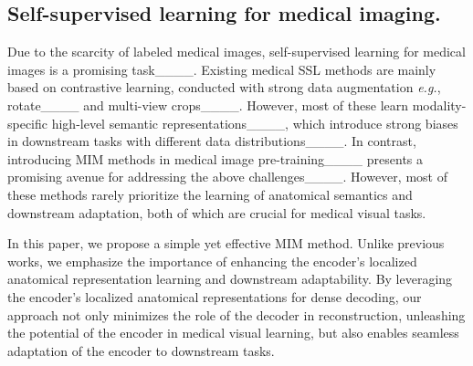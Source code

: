 \subsection{Self-supervised learning for medical imaging.}
Due to the scarcity of labeled medical images, self-supervised learning for medical images is a promising task____. Existing medical SSL methods are mainly based on contrastive learning, conducted with strong data augmentation \textit{e.g.}, rotate____ and multi-view crops____. However, most of these learn modality-specific high-level semantic representations____, which introduce strong biases in downstream tasks with different data distributions____. In contrast, introducing MIM methods in medical image pre-training____ presents a promising avenue for addressing the above challenges____. However, most of these methods rarely prioritize the learning of anatomical semantics and downstream adaptation, both of which are crucial for medical visual tasks.

In this paper, we propose a simple yet effective MIM method. Unlike previous works, we emphasize the importance of enhancing the encoder's localized anatomical representation learning and downstream adaptability. By leveraging the encoder’s localized anatomical representations for dense decoding, our approach not only minimizes the role of the decoder in reconstruction, unleashing the potential of the encoder in medical visual learning, but also enables seamless adaptation of the encoder to downstream tasks.